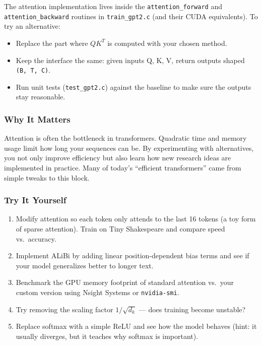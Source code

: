 \documentclass[
  letterpaper,
  DIV=11,
  numbers=noendperiod]{scrreprt}
\providecommand{\tightlist}{%
  \setlength{\itemsep}{0pt}\setlength{\parskip}{0pt}}
\begin{document}
The attention implementation lives inside the
\texttt{attention\_forward} and \texttt{attention\_backward} routines in
\texttt{train\_gpt2.c} (and their CUDA equivalents). To try an
alternative:

\begin{itemize}
\tightlist
\item
  Replace the part where \(QK^T\) is computed with your chosen method.
\item
  Keep the interface the same: given inputs Q, K, V, return outputs
  shaped \texttt{(B,\ T,\ C)}.
\item
  Run unit tests (\texttt{test\_gpt2.c}) against the baseline to make
  sure the outputs stay reasonable.
\end{itemize}

\subsubsection{Why It Matters}\label{why-it-matters-59}

Attention is often the bottleneck in transformers. Quadratic time and
memory usage limit how long your sequences can be. By experimenting with
alternatives, you not only improve efficiency but also learn how new
research ideas are implemented in practice. Many of today's ``efficient
transformers'' came from simple tweaks to this block.

\subsubsection{Try It Yourself}\label{try-it-yourself-73}

\begin{enumerate}
\def\labelenumi{\arabic{enumi}.}
\tightlist
\item
  Modify attention so each token only attends to the last 16 tokens (a
  toy form of sparse attention). Train on Tiny Shakespeare and compare
  speed vs.~accuracy.
\item
  Implement ALiBi by adding linear position-dependent bias terms and see
  if your model generalizes better to longer text.
\item
  Benchmark the GPU memory footprint of standard attention vs.~your
  custom version using Nsight Systems or \texttt{nvidia-smi}.
\item
  Try removing the scaling factor \(1/\sqrt{d_k}\) --- does training
  become unstable?
\item
  Replace softmax with a simple ReLU and see how the model behaves
  (hint: it usually diverges, but it teaches why softmax is important).
\end{enumerate}
\end{document}

